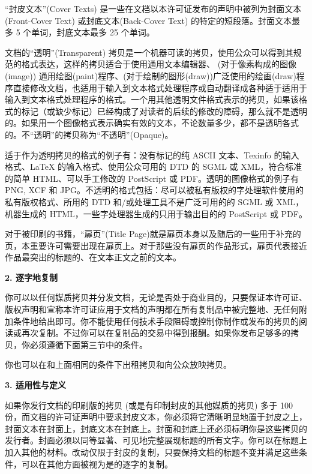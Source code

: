 ``封皮文本''(Cover Texts) 是一些在文档以本许可证发布的声明中被列为封面文本(Front-Cover Text) 或封底文本(Back-Cover Text) 的特定的短段落。封面文本最多 5 个单词，封底文本最多 25 个单词。

文档的``透明''(Transparent) 拷贝是一个机器可读的拷贝，使用公众可以得到其规范的格式表达，这样的拷贝适合于使用通用文本编辑器、 (对于像素构成的图像(image)) 通用绘图(paint)程序、(对于绘制的图形(draw))广泛使用的绘画(draw)程序直接修改文档，也适用于输入到文本格式处理程序或自动翻译成各种适于适用于输入到文本格式处理程序的格式。一个用其他透明文件格式表示的拷贝，如果该格式的标记（或缺少标记）已经构成了对读者的后续的修改的障碍，那么就不是透明的。如果用一个图像格式表示确实有效的文本，不论数量多少，都不是透明各式的。不``透明''的拷贝称为``不透明''(Opaque)。

适于作为透明拷贝的格式的例子有：没有标记的纯 ASCII 文本、Texinfo 的输入格式、LaTeX 的输入格式、使用公众可用的 DTD 的 SGML 或 XML，符合标准的简单 HTML、可以手工修改的 PostScript 或 PDF。透明的图像格式的例子有 PNG, XCF 和 JPG。不透明的格式包括：尽可以被私有版权的字处理软件使用的私有版权格式、所用的 DTD 和/或处理工具不是广泛可用的的 SGML 或 XML，机器生成的 HTML，一些字处理器生成的只用于输出目的的 PostScript 或 PDF。

对于被印刷的书籍，``扉页''(Title Page)就是扉页本身以及随后的一些用于补充的页，本重要许可需要出现在扉页上。对于那些没有扉页的作品形式，扉页代表接近作品最突出的标题的、在文本正文之前的文本。


\begin{center}
{\Large\bf 2. 逐字地复制\par}
\end{center}

你可以以任何媒质拷贝并分发文档，无论是否处于商业目的，只要保证本许可证、版权声明和宣称本许可证应用于文档的声明都在所有复制品中被完整地、无任何附加条件地给出即可。你不能使用任何技术手段阻碍或控制你制作或发布的拷贝的阅读或再次复制。不过你可以在复制品的交易中得到报酬。如果你发布足够多的拷贝，你必须遵循下面第三节中的条件。

你也可以在和上面相同的条件下出租拷贝和向公众放映拷贝。

\begin{center}
{\Large\bf 3. 适用性与定义\par}
\end{center}


如果你发行文档的印刷版的拷贝 (或是有印制封皮的其他媒质的拷贝) 多于 100 份，而文档的许可证声明中要求封皮文本，你必须将它清晰明显地置于封皮之上，封面文本在封面上，封底文本在封底上。封面和封底上还必须标明你是这些拷贝的发行者。封面必须以同等显著、可见地完整展现标题的所有文字。你可以在标题上加入其他的材料。改动仅限于封皮的复制，只要保持文档的标题不变并满足这些条件，可以在其他方面被视为是的逐字的复制。

